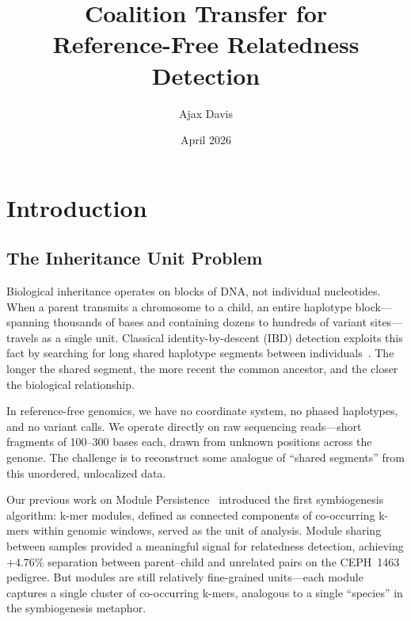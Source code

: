 \documentclass{../yalumba}
\title{Coalition Transfer for\\Reference-Free Relatedness Detection}
\author{Ajax Davis}
\date{April 2026}
\begin{document}
\maketitle

\tableofcontents
\newpage

\section{Introduction}
\label{sec:intro}


\subsection{The Inheritance Unit Problem}

Biological inheritance operates on blocks of DNA, not individual nucleotides.
When a parent transmits a chromosome to a child, an entire haplotype
block---spanning thousands of bases and containing dozens to hundreds of
variant sites---travels as a single unit.  Classical identity-by-descent (IBD)
detection exploits this fact by searching for long shared haplotype segments
between individuals~\cite{browning2012ibd, gusev2009germline}.  The longer the
shared segment, the more recent the common ancestor, and the closer the
biological relationship.


In reference-free genomics, we have no coordinate system, no phased haplotypes,
and no variant calls.  We operate directly on raw sequencing reads---short
fragments of 100--300 bases each, drawn from unknown positions across the
genome.  The challenge is to reconstruct some analogue of ``shared segments''
from this unordered, unlocalized data.

Our previous work on Module Persistence~\cite{margulis1998} introduced the
first symbiogenesis algorithm: k-mer modules, defined as connected components
of co-occurring k-mers within genomic windows, served as the unit of analysis.
Module sharing between samples provided a meaningful signal for relatedness
detection, achieving $+4.76\%$ separation between parent--child and unrelated
pairs on the CEPH~1463 pedigree.  But modules are still relatively fine-grained
units---each module captures a single cluster of co-occurring k-mers,
analogous to a single ``species'' in the symbiogenesis metaphor.
\end{document}
